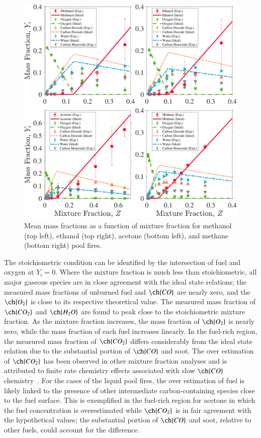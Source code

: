\documentclass[preprint,review,12pt]{elsarticle}
\begin{document}
\begin{figure}[!t]
	\centering
\includegraphics[width=14.27cm,keepaspectratio]{Combined_Mass_Frac_Mix_Frac.pdf}
	\caption[Mean mass fractions as a function of mixture fraction]{Mean mass fractions as a function of mixture fraction for methanol (top left), ethanol (top right), acetone (bottom left), and methane (bottom right) pool fires.}
	\label{fig:Mixture_Fraction}
\end{figure}

The stoichiometric condition can be identified by the intersection of fuel and oxygen at $Y_i=0$. Where the mixture fraction is much less than stoichiometric, all major gaseous species are in close agreement with the ideal state relations; the measured mass fractions of unburned fuel and $\ch{CO}$ are nearly zero, and the $\ch{O_2}$ is close to its respective theoretical value. The measured mass fraction of $\ch{CO_{2}}$ and $\ch{H_{2}O}$ are found to peak close to the stoichiometric mixture fraction. As the mixture fraction increases, the mass fraction of $\ch{O_2}$ is nearly zero, while the mass fraction of each fuel increases linearly. In the fuel-rich region, the measured mass fraction of $\ch{CO_{2}}$ differs considerably from the ideal state relation due to the substantial portion of $\ch{CO}$ and soot. The over estimation of $\ch{CO_{2}}$ has been observed in other mixture fraction analyses and is attributed to finite rate chemistry effects associated with slow $\ch{CO}$ chemistry~\cite{Sivathanu1990}. For the cases of the liquid pool fires, the over estimation of fuel is likely linked to the presence of other intermediate carbon-containing species close to the fuel surface. This is exemplified in the fuel-rich region for acetone in which the fuel concentration is overestimated while $\ch{CO_{2}}$ is in fair agreement with the hypothetical values; the substantial portion of $\ch{CO}$ and soot, relative to other fuels, could account for the difference. 
\end{document}

